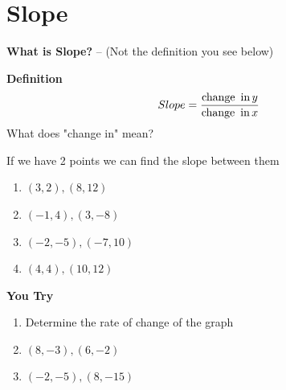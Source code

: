 \documentclass[12pt]{article}
\begin{document}
\pagebreak


\section*{Slope}

\textbf{What is Slope?} -- (Not the definition you see below)
\vspace{1in}



\textbf{Definition}\\
$$Slope=\frac{\text{change\, in\,}y}{\text{change\, in\,} x}$$
\indent What does "change in" mean?\\

\vspace{1in}

If we have 2 points we can find the slope between them\\

\begin{multicols}{2}
\begin{enumerate}
\item $(3,2),(8,12)$ \\

\item $(-1,4),(3,-8)$\\

\item $(-2,-5),(-7,10)$\\

\item $(4,4), (10,12)$\\
\end{enumerate}
\end{multicols}

\begin{Large}
\textbf{You Try}
\end{Large}

\begin{enumerate}
\item Determine the rate of change of the graph\\ 



\item $(8,-3),(6,-2)$\\

\item $(-2,-5),(8,-15)$\\
\end{enumerate}
\end{document}
